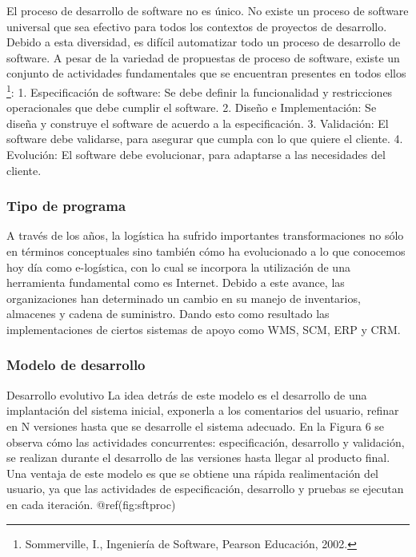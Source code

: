 \documentclass[
]{article}
\begin{document}
El proceso de desarrollo de software no es único. No existe un proceso
de software universal que sea efectivo para todos los contextos de
proyectos de desarrollo. Debido a esta diversidad, es difícil
automatizar todo un proceso de desarrollo de software. A pesar de la
variedad de propuestas de proceso de software, existe un conjunto de
actividades fundamentales que se encuentran presentes en todos ellos
\footnote{Sommerville, I., Ingeniería de Software, Pearson Educación,
  2002.}: 1. Especificación de software: Se debe definir la
funcionalidad y restricciones operacionales que debe cumplir el
software. 2. Diseño e Implementación: Se diseña y construye el software
de acuerdo a la especificación. 3. Validación: El software debe
validarse, para asegurar que cumpla con lo que quiere el cliente. 4.
Evolución: El software debe evolucionar, para adaptarse a las
necesidades del cliente.

\hypertarget{tipo-de-programa}{%
\subsubsection{Tipo de programa}\label{tipo-de-programa}}

A través de los años, la logística ha sufrido importantes
transformaciones no sólo en términos conceptuales sino también cómo ha
evolucionado a lo que conocemos hoy día como e-logística, con lo cual se
incorpora la utilización de una herramienta fundamental como es
Internet. Debido a este avance, las organizaciones han determinado un
cambio en su manejo de inventarios, almacenes y cadena de suministro.
Dando esto como resultado las implementaciones de ciertos sistemas de
apoyo como WMS, SCM, ERP y CRM.

\hypertarget{modelo-de-desarrollo}{%
\subsubsection{Modelo de desarrollo}\label{modelo-de-desarrollo}}

Desarrollo evolutivo La idea detrás de este modelo es el desarrollo de
una implantación del sistema inicial, exponerla a los comentarios del
usuario, refinar en N versiones hasta que se desarrolle el sistema
adecuado. En la Figura 6 se observa cómo las actividades concurrentes:
especificación, desarrollo y validación, se realizan durante el
desarrollo de las versiones hasta llegar al producto final. Una ventaja
de este modelo es que se obtiene una rápida realimentación del usuario,
ya que las actividades de especificación, desarrollo y pruebas se
ejecutan en cada iteración. @ref(fig:sftproc)
\end{document}
